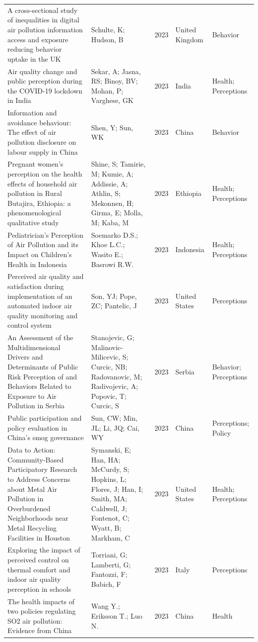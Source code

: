 {\begin{longtable}[t]{p{6cm}p{3cm}lp{3cm}p{3cm}}
A cross-sectional study of inequalities in digital air pollution information access and exposure reducing behavior uptake in the UK & Schulte, K; Hudson, B & 2023 & United Kingdom & Behavior\\
Air quality change and public perception during the COVID-19 lockdown in India & Sekar, A; Jasna, RS; Binoy, BV; Mohan, P; Varghese, GK & 2023 & India & Health; Perceptions\\
Information and avoidance behaviour: The effect of air pollution disclosure on labour supply in China & Shen, Y; Sun, WK & 2023 & China & Behavior\\
Pregnant women's perception on the health effects of household air pollution in Rural Butajira, Ethiopia: a phenomenological qualitative study & Shine, S; Tamirie, M; Kumie, A; Addissie, A; Athlin, S; Mekonnen, H; Girma, E; Molla, M; Kaba, M & 2023 & Ethiopia & Health; Perceptions\\
\addlinespace
Pediatrician's Perception of Air Pollution and its Impact on Children's Health in Indonesia & Soemarko D.S.; Khoe L.C.; Wasito E.; Basrowi R.W. & 2023 & Indonesia & Health; Perceptions\\
Perceived air quality and satisfaction during implementation of an automated indoor air quality monitoring and control system & Son, YJ; Pope, ZC; Pantelic, J & 2023 & United States & Perceptions\\
An Assessment of the Multidimensional Drivers and Determinants of Public Risk Perception of and Behaviors Related to Exposure to Air Pollution in Serbia & Stanojevic, G; Malinovic-Milicevic, S; Curcic, NB; Radovanovic, M; Radivojevic, A; Popovic, T; Curcic, S & 2023 & Serbia & Behavior; Perceptions\\
Public participation and policy evaluation in China's smog governance & Sun, CW; Min, JL; Li, JQ; Cai, WY & 2023 & China & Perceptions; Policy\\
Data to Action: Community-Based Participatory Research to Address Concerns about Metal Air Pollution in Overburdened Neighborhoods near Metal Recycling Facilities in Houston & Symanski, E; Han, HA; McCurdy, S; Hopkins, L; Flores, J; Han, I; Smith, MA; Caldwell, J; Fontenot, C; Wyatt, B; Markham, C & 2023 & United States & Health; Perceptions\\
\addlinespace
Exploring the impact of perceived control on thermal comfort and indoor air quality perception in schools & Torriani, G; Lamberti, G; Fantozzi, F; Babich, F & 2023 & Italy & Perceptions\\
The health impacts of two policies regulating SO2 air pollution: Evidence from China & Wang Y.; Eriksson T.; Luo N. & 2023 & China & Health\\

\end{longtable}}
